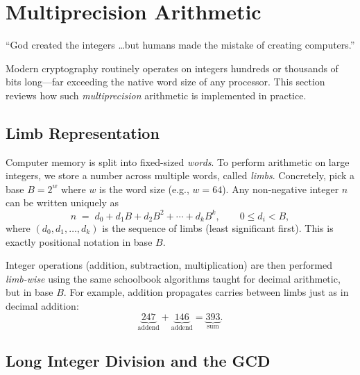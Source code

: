 \documentclass[11pt]{article}
\begin{document}
\section{Multiprecision Arithmetic}

\begin{tcolorbox}[colback=gray!8, colframe=gray!50, title=Motivating quote]
``God created the integers \ldots but humans made the mistake of
creating computers.''
\end{tcolorbox}

Modern cryptography routinely operates on integers hundreds or
thousands of bits long---far exceeding the native word size of any
processor.  This section reviews how such \emph{multiprecision}
arithmetic is implemented in practice.

\subsection{Limb Representation}

Computer memory is split into fixed-sized \emph{words}.  To perform
arithmetic on large integers, we store a number across multiple words,
called \emph{limbs}.  Concretely, pick a base $B = 2^w$ where $w$ is
the word size (e.g., $w = 64$).  Any non-negative integer $n$ can be
written uniquely as
\[
  n \;=\; d_0 + d_1 B + d_2 B^2 + \cdots + d_k B^k,
  \qquad 0 \le d_i < B,
\]
where $(d_0, d_1, \ldots, d_k)$ is the sequence of limbs (least
significant first).  This is exactly positional notation in base $B$.

Integer operations (addition, subtraction, multiplication) are then
performed \emph{limb-wise} using the same schoolbook algorithms taught
for decimal arithmetic, but in base $B$.  For example, addition
propagates carries between limbs just as in decimal addition:
\[
  \underbrace{247}_{\text{addend}} +
  \underbrace{146}_{\text{addend}} =
  \underbrace{393}_{\text{sum}}.
\]

\subsection{Long Integer Division and the GCD}
\end{document}
